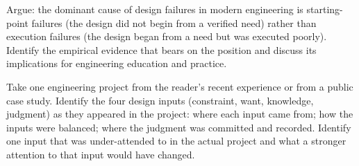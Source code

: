 \begin{exercise}
Argue: the dominant cause of design failures in modern engineering is starting-point failures (the design did not begin from a verified need) rather than execution failures (the design began from a need but was executed poorly). Identify the empirical evidence that bears on the position and discuss its implications for engineering education and practice.
\end{exercise}

\begin{exercise}
Take one engineering project from the reader's recent experience or from a public case study. Identify the four design inputs (constraint, want, knowledge, judgment) as they appeared in the project: where each input came from; how the inputs were balanced; where the judgment was committed and recorded. Identify one input that was under-attended to in the actual project and what a stronger attention to that input would have changed.
\end{exercise}
